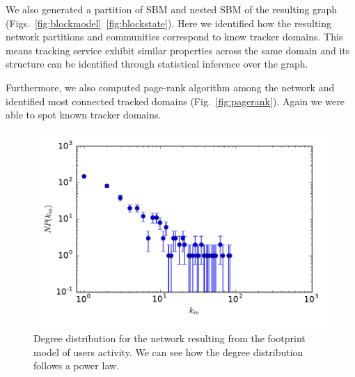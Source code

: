 We also generated a partition of SBM and nested SBM of the resulting graph (Figs.~\ref{fig:blockmodel}~\ref{fig:blockstate}). Here we identified how the resulting network partitions and communities correspond to know tracker domains. This means tracking service exhibit similar properties across the same domain and its structure can be identified through statistical inference over the graph.

Furthermore, we also computed page-rank algorithm among the network and identified most connected tracked domains (Fig.~\ref{fig:pagerank}). Again we were able to spot known tracker domains.

\begin{figure}
\includegraphics[width=\textwidth]{figures/deg-dist.pdf}
\caption[User activity network degree distribution]{Degree distribution for the network resulting from the footprint model of users activity. We can see how the degree distribution follows a power law.}
\label{fig:deg-dist}
\end{figure}


